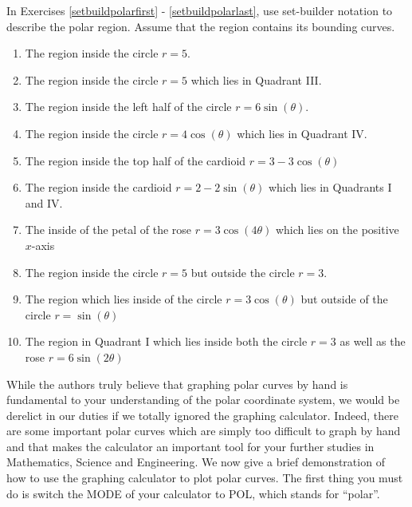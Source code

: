 In Exercises \ref{setbuildpolarfirst} - \ref{setbuildpolarlast}, use set-builder notation to describe the polar region.  Assume that the region contains its bounding curves.

\begin{enumerate}

\setcounter{enumi}{\value{HW}}

\item The region inside the circle $r = 5$. \label{setbuildpolarfirst}
\item The region inside the circle $r=5$ which lies in Quadrant III.
\item The region inside the left half of the circle $r = 6\sin(\theta)$.
\item The region inside the circle $r = 4\cos(\theta)$ which lies in Quadrant IV.
\item The region inside the top half of the cardioid $r = 3 - 3\cos(\theta)$
\item The region inside the cardioid $r = 2-2\sin(\theta)$ which lies in Quadrants I and IV.
\item The inside of the petal of the rose $r = 3\cos(4\theta)$ which lies on the positive $x$-axis
\item The region inside the circle $r=5$ but outside the circle $r=3$.
\item The region which lies inside of the circle $r = 3\cos(\theta)$ but outside of the circle $r = \sin(\theta)$
\item The region in Quadrant I which lies inside both the circle $r=3$ as well as the rose $r = 6\sin(2\theta)$ \label{setbuildpolarlast}

\setcounter{HW}{\value{enumi}}

\end{enumerate}


\label{polargraphscalculator}
While the authors truly believe that graphing polar curves by hand is fundamental to your understanding of the polar coordinate system, we would be derelict in our duties if we totally ignored the graphing calculator.  Indeed, there are some important polar curves which are simply too difficult to graph by hand and that makes the calculator an important tool for your further studies in Mathematics, Science and Engineering.  We now give a brief demonstration of how to use the graphing calculator to plot polar curves.  The first thing you must do is switch the MODE of your calculator to POL, which stands for ``polar''. 

